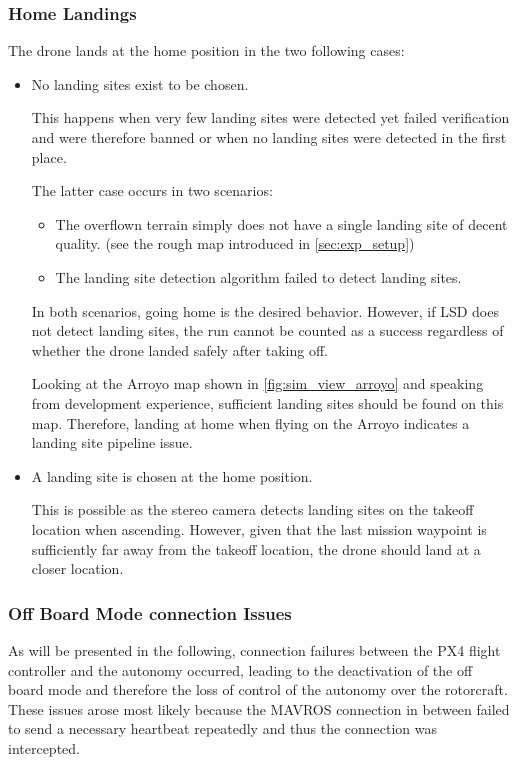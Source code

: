 \subsubsection{Home Landings}
The drone lands at the home position in the two following cases:
\begin{itemize}
    \item No landing sites exist to be chosen.

    This happens when very few landing sites were detected yet failed verification and were therefore banned or when no landing sites were detected in the first place. 

    The latter case occurs in two scenarios: 
    \begin{itemize}
        \item The overflown terrain simply does not have a single landing site of decent quality. (see the rough map introduced in \cref{sec:exp_setup})
        \item The landing site detection algorithm failed to detect landing sites.
    \end{itemize}
    In both scenarios, going home is the desired behavior. However, if LSD does not detect landing sites, the run cannot be counted as a success regardless of whether the drone landed safely after taking off.

    Looking at the Arroyo map shown in \cref{fig:sim_view_arroyo} and speaking from development experience, sufficient landing sites should be found on this map. Therefore, landing at home when flying on the Arroyo indicates a landing site pipeline issue.
    \item A landing site is chosen at the home position.

    This is possible as the stereo camera detects landing sites on the takeoff location when ascending. However, given that the last mission waypoint is sufficiently far away from the takeoff location, the drone should land at a closer location. 
\end{itemize}
\subsubsection{Off Board Mode connection Issues}
As will be presented in the following, connection failures between the PX4 flight controller and the autonomy occurred, leading to the deactivation of the off board mode and therefore the loss of control of the autonomy over the rotorcraft. These issues arose most likely because the MAVROS connection in between failed to send a necessary heartbeat repeatedly and thus the connection was intercepted.

